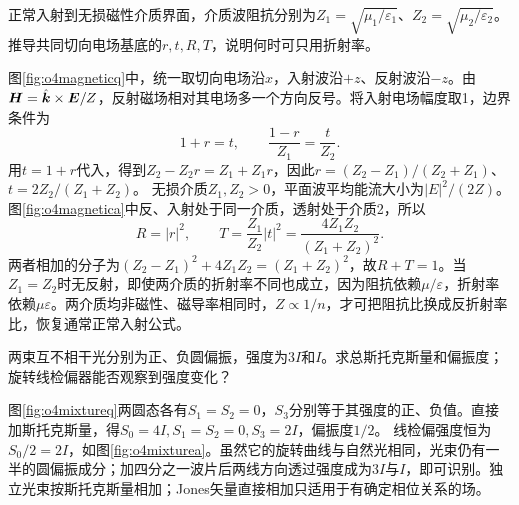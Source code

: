 \begin{exercise}\label{ex:o4magneticinterface}
正常入射到无损磁性介质界面，介质波阻抗分别为$Z_1=\sqrt{\mu_1/\varepsilon_1}$、$Z_2=\sqrt{\mu_2/\varepsilon_2}$。推导共同切向电场基底的$r,t,R,T$，说明何时可只用折射率。
\end{exercise}
\begin{solution}
图\ref{fig:o4magneticq}中，统一取切向电场沿$x$，入射波沿$+z$、反射波沿$-z$。由$\bm{H}=\hat{\bm{k}}\times\bm{E}/Z$，反射磁场相对其电场多一个方向反号。将入射电场幅度取1，边界条件为
\[
 1+r=t,\qquad \frac{1-r}{Z_1}=\frac t{Z_2}.
\]
用$t=1+r$代入，得到$Z_2-Z_2r=Z_1+Z_1r$，因此$r=(Z_2-Z_1)/(Z_2+Z_1)$、$t=2Z_2/(Z_1+Z_2)$。
无损介质$Z_1,Z_2>0$，平面波平均能流大小为$|E|^2/(2Z)$。图\ref{fig:o4magnetica}中反、入射处于同一介质，透射处于介质2，所以
\[
 R=|r|^2,\qquad T=\frac{Z_1}{Z_2}|t|^2
 =\frac{4Z_1Z_2}{(Z_1+Z_2)^2}.
\]
两者相加的分子为$(Z_2-Z_1)^2+4Z_1Z_2=(Z_1+Z_2)^2$，故$R+T=1$。当$Z_1=Z_2$时无反射，即使两介质的折射率不同也成立，因为阻抗依赖$\mu/\varepsilon$，折射率依赖$\mu\varepsilon$。两介质均非磁性、磁导率相同时，$Z\propto1/n$，才可把阻抗比换成反折射率比，恢复通常正常入射公式。
\end{solution}

\begin{exercise}\label{ex:o4uncertaintystate}
两束互不相干光分别为正、负圆偏振，强度为$3I$和$I$。求总斯托克斯量和偏振度；旋转线检偏器能否观察到强度变化？
\end{exercise}
\begin{solution}
图\ref{fig:o4mixtureq}两圆态各有$S_1=S_2=0$，$S_3$分别等于其强度的正、负值。直接加斯托克斯量，得$S_0=4I,S_1=S_2=0,S_3=2I$，偏振度$1/2$。
线检偏强度恒为$S_0/2=2I$，如图\ref{fig:o4mixturea}。虽然它的旋转曲线与自然光相同，光束仍有一半的圆偏振成分；加四分之一波片后两线方向透过强度成为$3I$与$I$，即可识别。独立光束按斯托克斯量相加；Jones矢量直接相加只适用于有确定相位关系的场。
\end{solution}

